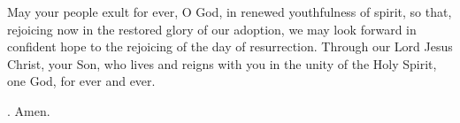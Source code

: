 \lettrine[lines=3]{M}{}ay your people exult for ever, O God,
in renewed youthfulness of spirit,
so that, rejoicing now in the restored glory of our adoption,
we may look forward in confident hope
to the rejoicing of the day of resurrection.
Through our Lord Jesus Christ, your Son,
who lives and reigns with you in the unity of the Holy Spirit,
one God, for ever and ever.
\par \Rbar. Amen.

